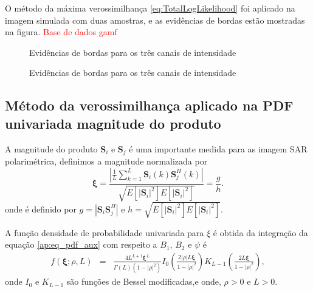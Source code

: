 O método da máxima verossimilhança \eqref{eq:TotalLogLikelihood} foi aplicado na imagem simulada com duas amostras, e as evidências de bordas estão mostradas na figura. \textcolor{red}{Base de dados gamf}
 \begin{figure*}[hbt]
	\centering
    \caption{Evidências de bordas para os três canais de intensidade}
     \label{evidencias_hh_hv_vv_gamf} 
   \end{figure*}
   
   \begin{figure*}[hbt]
	\centering
    \caption{Evidências de bordas para os três canais de intensidade}
     \label{evidencias_hh_hv_vv_gamf} 
   \end{figure*}

\subsection{Método da verossimilhança aplicado na PDF univariada magnitude do produto}
A magnitude do produto $\mathbf{S}_i$ e $\mathbf{S}_j$ é uma importante medida para as imagem SAR polarimétrica, definimos a magnitude normalizada por 
\begin{equation}
	\bm\xi = \frac{\left|\frac{1}{L} \sum_{k=1}^L\mathbf{S}_i(k)\mathbf{S}_j^H(k) \right|}{\sqrt{E[|\mathbf{S}_i|^2]E[|\mathbf{S}_i|^2]}}=\frac{g}{h}.
\end{equation}
onde é definido por $g=|\mathbf{S}_i\mathbf{S}_j^H|$ e $h=\sqrt{E[|\mathbf{S}_i|^2]E[|\mathbf{S}_i|^2]}$.

A  função densidade de probabilidade univariada para $\xi$ é obtida da integração da equação \eqref{ap:eq_pdf_aux} com respeito a $B_1$, $B_2$ e $\psi$ é
\begin{equation}\label{eq:pdf_mag_prod}
\begin{array}{lcl}
	f(\bm \xi;\rho, L)&=&\frac{4L^{L+1}\bm\xi^L}{\Gamma(L)(1-|\rho|^2)}I_0\left(\frac{2|\rho|L\bm\xi}{1-|\rho|^2}\right)K_{L-1}\left(\frac{2L\bm\xi}{1-|\rho|^2}\right),
		\end{array}
\end{equation}
onde $I_0$ e $K_{L-1}$ são funções de Bessel modificadas,e onde, $\rho>0$ e $L>0$.


